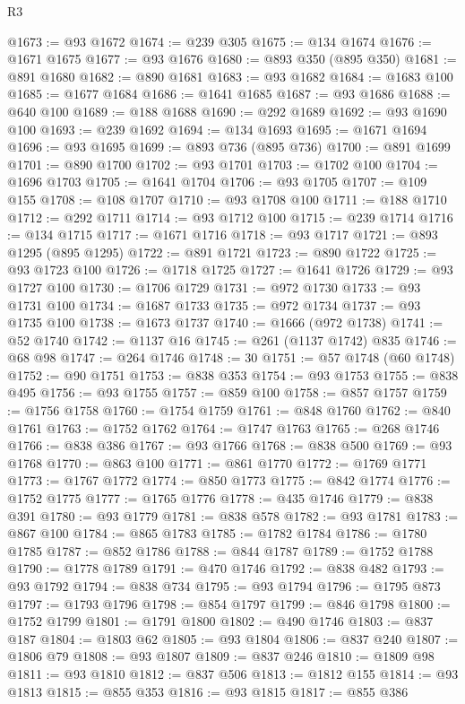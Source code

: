 \begin{lexlean}{R3}
\begin{coremodule}
@1673 := @93 @1672
@1674 := @239 @305
@1675 := @134 @1674
@1676 := @1671 @1675
@1677 := @93 @1676
@1680 := @893 @350 (@895 @350)
@1681 := @891 @1680
@1682 := @890 @1681
@1683 := @93 @1682
@1684 := @1683 @100
@1685 := @1677 @1684
@1686 := @1641 @1685
@1687 := @93 @1686
@1688 := @640 @100
@1689 := @188 @1688
@1690 := @292 @1689
@1692 := @93 @1690 @100
@1693 := @239 @1692
@1694 := @134 @1693
@1695 := @1671 @1694
@1696 := @93 @1695
@1699 := @893 @736 (@895 @736)
@1700 := @891 @1699
@1701 := @890 @1700
@1702 := @93 @1701
@1703 := @1702 @100
@1704 := @1696 @1703
@1705 := @1641 @1704
@1706 := @93 @1705
@1707 := @109 @155
@1708 := @108 @1707
@1710 := @93 @1708 @100
@1711 := @188 @1710
@1712 := @292 @1711
@1714 := @93 @1712 @100
@1715 := @239 @1714
@1716 := @134 @1715
@1717 := @1671 @1716
@1718 := @93 @1717
@1721 := @893 @1295 (@895 @1295)
@1722 := @891 @1721
@1723 := @890 @1722
@1725 := @93 @1723 @100
@1726 := @1718 @1725
@1727 := @1641 @1726
@1729 := @93 @1727 @100
@1730 := @1706 @1729
@1731 := @972 @1730
@1733 := @93 @1731 @100
@1734 := @1687 @1733
@1735 := @972 @1734
@1737 := @93 @1735 @100
@1738 := @1673 @1737
@1740 := @1666 (@972 @1738)
@1741 := @52 @1740
@1742 := @1137 @16
@1745 := @261 (@1137 @1742) @835
@1746 := @68 @98
@1747 := @264 @1746
@1748 := 30
@1751 := @57 @1748 (@60 @1748)
@1752 := @90 @1751
@1753 := @838 @353
@1754 := @93 @1753
@1755 := @838 @495
@1756 := @93 @1755
@1757 := @859 @100
@1758 := @857 @1757
@1759 := @1756 @1758
@1760 := @1754 @1759
@1761 := @848 @1760
@1762 := @840 @1761
@1763 := @1752 @1762
@1764 := @1747 @1763
@1765 := @268 @1746
@1766 := @838 @386
@1767 := @93 @1766
@1768 := @838 @500
@1769 := @93 @1768
@1770 := @863 @100
@1771 := @861 @1770
@1772 := @1769 @1771
@1773 := @1767 @1772
@1774 := @850 @1773
@1775 := @842 @1774
@1776 := @1752 @1775
@1777 := @1765 @1776
@1778 := @435 @1746
@1779 := @838 @391
@1780 := @93 @1779
@1781 := @838 @578
@1782 := @93 @1781
@1783 := @867 @100
@1784 := @865 @1783
@1785 := @1782 @1784
@1786 := @1780 @1785
@1787 := @852 @1786
@1788 := @844 @1787
@1789 := @1752 @1788
@1790 := @1778 @1789
@1791 := @470 @1746
@1792 := @838 @482
@1793 := @93 @1792
@1794 := @838 @734
@1795 := @93 @1794
@1796 := @1795 @873
@1797 := @1793 @1796
@1798 := @854 @1797
@1799 := @846 @1798
@1800 := @1752 @1799
@1801 := @1791 @1800
@1802 := @490 @1746
@1803 := @837 @187
@1804 := @1803 @62
@1805 := @93 @1804
@1806 := @837 @240
@1807 := @1806 @79
@1808 := @93 @1807
@1809 := @837 @246
@1810 := @1809 @98
@1811 := @93 @1810
@1812 := @837 @506
@1813 := @1812 @155
@1814 := @93 @1813
@1815 := @855 @353
@1816 := @93 @1815
@1817 := @855 @386

\end{coremodule}
\end{lexlean}
